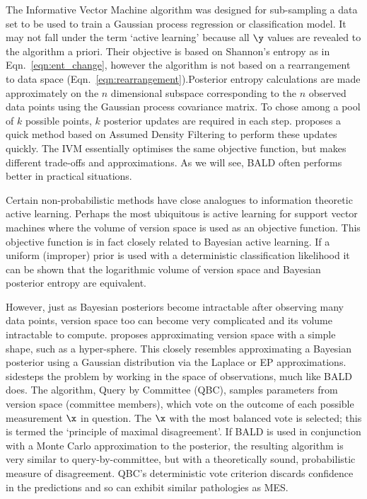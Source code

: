 The Informative Vector Machine \citep[IVM,][]{lawrence2004} algorithm was designed for sub-sampling a data set to be used to train a Gaussian process regression or classification model. It may not fall under the term `active learning' because all $\y$ values are revealed to the algorithm a priori. Their objective is based on Shannon's entropy as in Eqn.\ \eqref{eqn:ent_change}, however the algorithm is not based on a rearrangement to data space (Eqn.\ \eqref{eqn:rearrangement}).Posterior entropy calculations are made approximately on the $n$ dimensional subspace corresponding to the $n$ observed data points using the Gaussian process covariance matrix. To chose among a pool of $k$ possible points, $k$ posterior updates are required in each step. \citep{lawrence2004} proposes a quick method based on Assumed Density Filtering to perform these updates quickly. The IVM essentially optimises the same objective function, but makes different trade-offs and approximations. As we will see, BALD often performs better in practical situations.

Certain non-probabilistic methods have close analogues to information theoretic active learning. Perhaps the most ubiquitous is active learning for support vector machines \citep[SVM,][]{tong2001,seung1992} where the volume of version space is used as an objective function. This objective function is in fact closely related to Bayesian active learning. If a uniform (improper) prior is used with a deterministic classification likelihood it can be shown that the logarithmic volume of version space and Bayesian posterior entropy are equivalent.

However, just as Bayesian posteriors become intractable after observing many data points, version space too can become very complicated and its volume intractable to compute. \citep{tong2001} proposes approximating version space with a simple shape, such as a hyper-sphere. This closely resembles approximating a Bayesian posterior using a Gaussian distribution via the Laplace or EP approximations. \citep{seung1992} sidesteps the problem by working in the space of observations, much like BALD does. The algorithm, Query by Committee (QBC), samples parameters from version space (committee members), which vote on the outcome of each possible measurement $\x$ in question. The $\x$ with the most balanced vote is selected; this is termed the `principle of maximal disagreement'. If BALD is used in conjunction with a Monte Carlo approximation to the posterior, the resulting algorithm is very similar to query-by-committee, but with a theoretically sound, probabilistic measure of disagreement. QBC's deterministic vote criterion discards confidence in the predictions and so can exhibit similar pathologies as MES.

